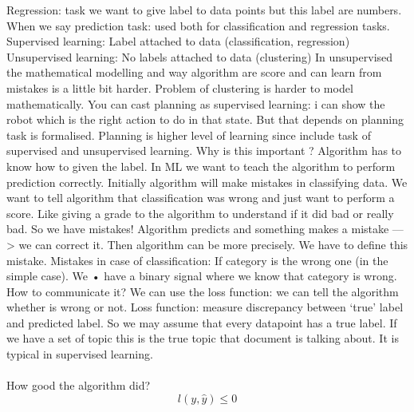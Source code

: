 \documentclass[12pt]{article}
\begin{document}
Regression: task we want to give label to data points but this label are
numbers.
When we say prediction task: used both for classification and regression
tasks.
Supervised learning: Label attached to data (classification, regression)
Unsupervised learning: No labels attached to data (clustering)
In unsupervised the mathematical modelling and way algorithm are score and
can learn from mistakes is a little bit harder. Problem of clustering is harder to
model mathematically.
You can cast planning as supervised learning: i can show the robot which is
the right action to do in that state. But that depends on planning task is
formalised.
Planning is higher level of learning since include task of supervised and
unsupervised learning.
Why is this important ?
Algorithm has to know how to given the label.
In ML we want to teach the algorithm to perform prediction correctly. Initially
algorithm will make mistakes in classifying data. We want to tell algorithm that
classification was wrong and just want to perform a score. Like giving a grade
to the algorithm to understand if it did bad or really bad.
So we have mistakes!
Algorithm predicts and something makes a mistake —> we can correct it.
Then algorithm can be more precisely.
We have to define this mistake.
Mistakes in case of classification:
If category is the wrong one (in the simple case). We • have a binary signal
where we know that category is wrong.
How to communicate it?
We can use the loss function: we can tell the algorithm whether is wrong or
not.
Loss function: measure discrepancy between ‘true’ label and predicted
label.
So we may assume that every datapoint has a true label.
If we have a set of topic this is the true topic that document is talking about.
It is typical in supervised learning.
\\\\
How good the algorithm did?
\\

\[l(y,\hat{y})\leq0 \]
\end{document}
